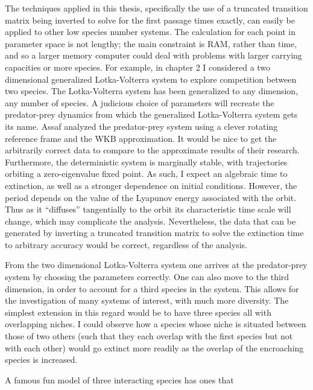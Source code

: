 The techniques applied in this thesis, specifically the use of a truncated transition matrix being inverted to solve for the first passage times exactly, can easily be applied to other low species number systems. 
The calculation for each point in parameter space is not lengthy; the main constraint is RAM, rather than time, and so a larger memory computer could deal with problems with larger carrying capacities or more species. %
For example, in chapter 2 I considered a two dimensional generalized Lotka-Volterra system to explore competition between two species. 
The Lotka-Volterra system has been generalized to any dimension, any number of species. 
A judicious choice of parameters will recreate the predator-prey dynamics from which the generalized Lotka-Volterra system gets its name. 
Assaf \cite{} analyzed the predator-prey system using a clever rotating reference frame and the WKB approximation. 
It would be nice to get the arbitrarily correct data to compare to the approximate results of their research. 
Furthermore, the deterministic system is marginally stable, with trajectories orbiting a zero-eigenvalue fixed point. As such, I expect an algebraic time to extinction, as well as a stronger dependence on initial conditions. 
However, the period depends on the value of the Lyapunov energy associated with the orbit. Thus as it ``diffuses'' tangentially to the orbit its characteristic time scale will change, which may complicate the analysis. 
Nevertheless, the data that can be generated by inverting a truncated transition matrix to solve the extinction time to arbitrary accuracy would be correct, regardless of the analysis. 

From the two dimensional Lotka-Volterra system one arrives at the predator-prey system by choosing the parameters correctly. 
One can also move to the third dimension, in order to account for a third species in the system. 
This allows for the investigation of many systems of interest, with much more diversity. 
The simplest extension in this regard would be to have three species all with overlapping niches. 
I could observe how a species whose niche is situated between those of two others (such that they each overlap with the first species but not with each other) would go extinct more readily as the overlap of the encroaching species is increased. 

A famous fun model of three interacting species has ones that %







